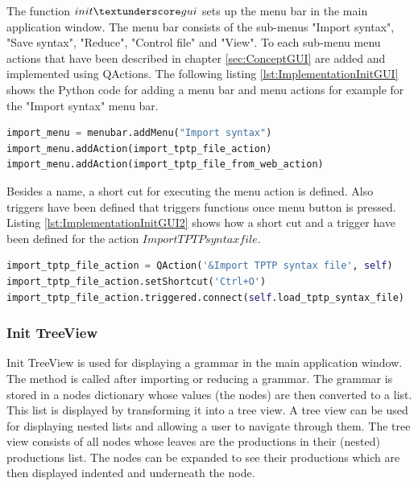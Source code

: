 The function $init\textunderscore gui$ sets up the menu bar in the main application window. The menu bar consists of the sub-menus "Import syntax", "Save syntax", "Reduce", "Control file" and "View". To each sub-menu menu actions that have been described in chapter \ref{sec:ConceptGUI} are added and implemented using QActions. The following listing \ref{lst:ImplementationInitGUI} shows the Python code for adding a menu bar and menu actions for example for the "Import syntax" menu bar.

\begin{lstlisting}[language=Python, basicstyle=\scriptsize	,caption= Implementation of menu bar,label= lst:ImplementationInitGUI]
import_menu = menubar.addMenu("Import syntax")
import_menu.addAction(import_tptp_file_action)
import_menu.addAction(import_tptp_file_from_web_action)
\end{lstlisting}

Besides a name, a short cut for executing the menu action is defined. Also triggers have been defined that triggers functions once menu button is pressed. Listing \ref{lst:ImplementationInitGUI2} shows how a short cut and a trigger have been defined for the action $Import TPTP syntax file$.

\begin{lstlisting}[language=Python, basicstyle=\scriptsize	,caption= Implementation of menu actions,label= lst:ImplementationInitGUI2]
import_tptp_file_action = QAction('&Import TPTP syntax file', self)
import_tptp_file_action.setShortcut('Ctrl+O')
import_tptp_file_action.triggered.connect(self.load_tptp_syntax_file)
\end{lstlisting}


\subsubsection{Init TreeView}\label{sec:ImplementationGUIInitTreeView}
Init TreeView is used for displaying a grammar in the main application window. The method is called after importing or reducing a grammar. The grammar is stored in a nodes dictionary whose values (the nodes) are then converted to a list. This list is displayed by transforming it into a tree view. A tree view can be used for displaying nested lists and allowing a user to navigate through them. The tree view consists of all nodes whose leaves are the productions in their (nested) productions list. The nodes can be expanded to see their productions which are then displayed indented and underneath the node.

